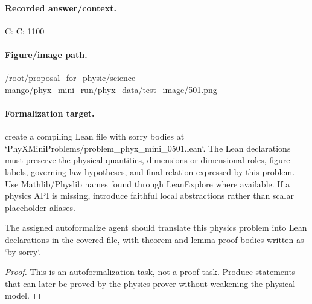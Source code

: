 \paragraph{Recorded answer/context.}
C: C: 1100

\paragraph{Figure/image path.}
/root/proposal\_for\_physic/science-mango/phyx\_mini\_run/phyx\_data/test\_image/501.png

\paragraph{Formalization target.}
create a compiling Lean file with sorry bodies at `PhyXMiniProblems/problem\_phyx\_mini\_0501.lean`. The Lean declarations must preserve the physical quantities, dimensions or dimensional roles, figure labels, governing-law hypotheses, and final relation expressed by this problem.
Use Mathlib/Physlib names found through LeanExplore where available. If a physics API is missing, introduce faithful local abstractions rather than scalar placeholder aliases.

\begin{theorem}
\label{thm:physics:phyx_mini_0501:target}
The assigned autoformalize agent should translate this physics problem into Lean declarations in the covered file, with theorem and lemma proof bodies written as `by sorry`.
\end{theorem}
\begin{proof}
This is an autoformalization task, not a proof task. Produce statements that can later be proved by the physics prover without weakening the physical model.
\end{proof}

